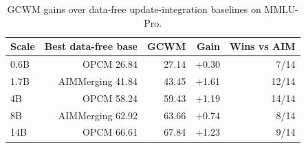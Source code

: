 \documentclass{article}
\begin{document}
\begin{table}[!htbp]
\centering
\caption{GCWM gains over data-free update-integration baselines on MMLU-Pro.}
\label{tab:app_mmlu_rcwm_gain}
\footnotesize
\setlength{\tabcolsep}{4.5pt}
\renewcommand{\arraystretch}{1.08}
\begin{tabular}{lrrrr}
\toprule[0.9pt]
Scale & Best data-free base & GCWM & Gain & Wins vs AIM \\
\midrule
\rowcolor{rcwmBlue} 0.6B & OPCM 26.84 & 27.14 & +0.30 & 7/14 \\
\rowcolor{rcwmBlue} 1.7B & AIMMerging 41.84 & 43.45 & +1.61 & 12/14 \\
\rowcolor{rcwmBlue} 4B & OPCM 58.24 & 59.43 & +1.19 & 14/14 \\
\rowcolor{rcwmBlue} 8B & AIMMerging 62.92 & 63.66 & +0.74 & 8/14 \\
\rowcolor{rcwmBlue} 14B & OPCM 66.61 & 67.84 & +1.23 & 9/14 \\
\bottomrule[0.9pt]
\end{tabular}
\end{table}
\end{document}

